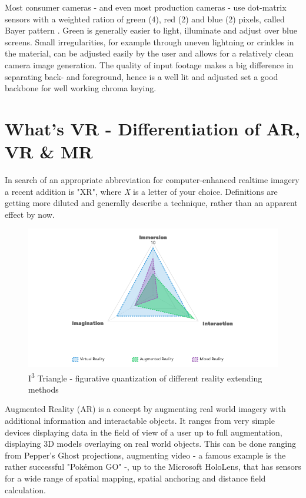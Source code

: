 
Most consumer cameras - and even most production cameras - use dot-matrix 
sensors with a weighted ration of green (4), red (2) and blue (2) pixels, 
called Bayer pattern \cite{kodak:bayer:1976}. Green is generally easier to 
light, illuminate and adjust over blue screens. Small irregularities, for 
example through uneven lightning or crinkles in the material, can be adjusted 
easily by the user and allows for a relatively clean camera image generation.
\newline
The quality of input footage makes a big difference in separating back- and 
foreground, hence is a well lit and adjusted set a good backbone for well 
working chroma keying.

\section{What's VR - Differentiation of AR, VR \& MR}

In search of an appropriate abbreviation for computer-enhanced realtime imagery 
a recent addition is "XR", where \textit{X} is a letter of your choice. 
Definitions are getting more diluted and generally describe a technique, rather 
than an apparent effect by now.

\begin{figure}[htb]
	\includegraphics[width=\textwidth]{_raw_resources/i3-triangle.png}
	\caption{I\textsuperscript{3} Triangle - figurative quantization of 
		different reality extending methods}
	\label{fig:xr:i3-triangle}
\end{figure}
Augmented Reality (AR) is a concept by augmenting real world imagery with 
additional information and interactable objects. It ranges from very simple 
devices displaying data in the field of view of a user up to full augmentation, 
displaying 3D models overlaying on real world objects. This can be done ranging 
from Pepper's Ghost projections, augmenting video - a famous example is the 
rather successful "Pokémon GO" -, up to the Microsoft HoloLens, that has 
sensors for a wide range of spatial mapping, spatial anchoring and distance 
field calculation.

